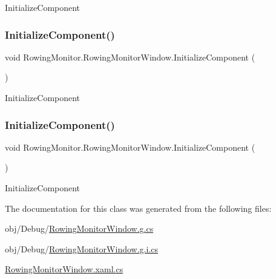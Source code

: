 Initialize\+Component 

\mbox{\label{class_rowing_monitor_1_1_rowing_monitor_window_ace5d64ad5ace3448f5390d3bb57ddc2e}} 
\subsubsection{\texorpdfstring{Initialize\+Component()}{InitializeComponent()}\hspace{0.1cm}{\footnotesize\ttfamily [3/4]}}
{\footnotesize\ttfamily void Rowing\+Monitor.\+Rowing\+Monitor\+Window.\+Initialize\+Component (\begin{DoxyParamCaption}{ }\end{DoxyParamCaption})}



Initialize\+Component 

\mbox{\label{class_rowing_monitor_1_1_rowing_monitor_window_ace5d64ad5ace3448f5390d3bb57ddc2e}} 
\subsubsection{\texorpdfstring{Initialize\+Component()}{InitializeComponent()}\hspace{0.1cm}{\footnotesize\ttfamily [4/4]}}
{\footnotesize\ttfamily void Rowing\+Monitor.\+Rowing\+Monitor\+Window.\+Initialize\+Component (\begin{DoxyParamCaption}{ }\end{DoxyParamCaption})}



Initialize\+Component 



The documentation for this class was generated from the following files\+:\begin{DoxyCompactItemize}
\item 
obj/\+Debug/\hyperlink{_debug_2_rowing_monitor_window_8g_8cs}{Rowing\+Monitor\+Window.\+g.\+cs}\item 
obj/\+Debug/\hyperlink{_debug_2_rowing_monitor_window_8g_8i_8cs}{Rowing\+Monitor\+Window.\+g.\+i.\+cs}\item 
\hyperlink{_rowing_monitor_window_8xaml_8cs}{Rowing\+Monitor\+Window.\+xaml.\+cs}\end{DoxyCompactItemize}
